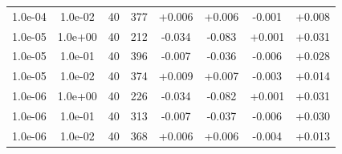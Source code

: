 \documentclass[11pt,a4paper]{article}
\begin{document}
\begin{table}
{\begin{tabular}{*{8}c}
 1.0e-04 	 & 1.0e-02 	 & 40 & 377 	 & +0.006 & +0.006 & -0.001 & +0.008 \\ 
 1.0e-05 	 & 1.0e+00 	 & 40 & 212 	 & -0.034 & -0.083 & +0.001 & +0.031 \\ 
 1.0e-05 	 & 1.0e-01 	 & 40 & 396 	 & -0.007 & -0.036 & -0.006 & +0.028 \\ 
 1.0e-05 	 & 1.0e-02 	 & 40 & 374 	 & +0.009 & +0.007 & -0.003 & +0.014 \\ 
 1.0e-06 	 & 1.0e+00 	 & 40 & 226 	 & -0.034 & -0.082 & +0.001 & +0.031 \\ 
 1.0e-06 	 & 1.0e-01 	 & 40 & 313 	 & -0.007 & -0.037 & -0.006 & +0.030 \\ 
 1.0e-06 	 & 1.0e-02 	 & 40 & 368 	 & +0.006 & +0.006 & -0.004 & +0.013 \\ 
\end{tabular}}
\end{table} 
\end{document}
